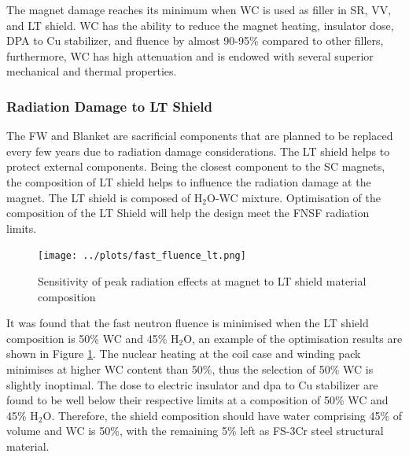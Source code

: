 \documentclass[12pt, letterpaper]{elsarticle}
\begin{document}
The magnet damage reaches its minimum when WC is used as filler in SR, VV, and LT shield. WC has the ability to reduce the magnet heating, insulator dose, DPA to Cu stabilizer, and fluence by almost 90-95\% compared to other fillers, furthermore, WC has high attenuation and is endowed with several superior mechanical and thermal properties.

\subsubsection{Radiation Damage to LT Shield}
The FW and Blanket are sacrificial components that are planned to be replaced every few years due to radiation damage considerations. The LT shield helps to protect external components. Being the closest component to the SC magnets, the composition of LT shield helps to influence the radiation damage at the magnet. The LT shield is composed of H$_2$O-WC mixture. Optimisation of the composition of the LT Shield will help the design meet the FNSF radiation limits.

\begin{figure}[h!]
  \centering
  \texttt{[image: ../plots/fast\_fluence\_lt.png]}
  \caption{Sensitivity of peak radiation effects at magnet to LT shield material composition}
  \label{fig:fast_fluence}
\end{figure}

It was found that the fast neutron fluence is minimised when the LT shield composition is 50\% WC and 45\% H$_2$O, an example of the optimisation results are shown in Figure \ref{fig:fast_fluence}. The nuclear heating at the coil case and winding pack minimises at higher WC content than 50\%, thus the selection of 50\% WC is slightly inoptimal. The dose to electric insulator and dpa to Cu stabilizer are found to be well below their respective limits at a composition of 50\% WC and 45\% H$_2$O. Therefore, the shield composition should have water comprising 45\% of volume and WC is 50\%, with the remaining 5\% left as FS-3Cr steel structural material. 
\end{document}
